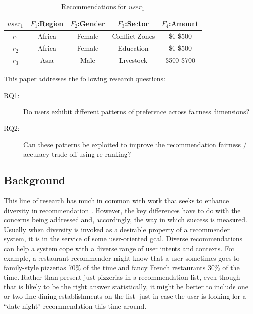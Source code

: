 \begin{table}[tbh]\centering
    \begin{tabular}{|c|c|c|c|c|}
    \hline
        $user_{1}$ & $F_{1}$:Region & $F_{2}$:Gender & $F_{3}$:Sector & $F_{4}$:Amount \\
    \hline
        $r_{1}$ & Africa & Female & Conflict Zones & \$0-\$500\\
    \hline
        $r_{2}$ & Africa & Female & Education & \$0-\$500\\
    \hline \rowcolor[gray]{0.7}
        $r_{3}$ & Asia & Male & Livestock & \$500-\$700\\
    \hline
    \end{tabular}
    \caption{Recommendations for $user_{1}$}
    \label{table_user_recoms}
\end{table}


This paper addresses the following research questions:
\begin{description}
    \item [RQ1:] Do users exhibit different patterns of preference across fairness dimensions?
    \item [RQ2:] Can these patterns be exploited to improve the recommendation fairness / accuracy trade-off using re-ranking?
\end{description}

\subsection{Background}
\label{subsec:ofair_backgroundd}

This line of research has much in common with work that seeks to enhance diversity in recommendation \cite{zhang2008MonotonyDiv, vargas2011rankRelDiv, carbonell1998use, eskandanian2017clustering}. However, the key differences have to do with the concerns being addressed and, accordingly, the way in which success is measured. Usually when diversity is invoked as a desirable property of a recommender system, it is in the service of some user-oriented goal. Diverse recommendations can help a system cope with a diverse range of user intents and contexts. For example, a restaurant recommender might know that a user sometimes goes to family-style pizzerias 70\% of the time and fancy French restaurants 30\% of the time. Rather than present just pizzerias in a recommendation list, even though that is likely to be the right answer statistically, it might be better to include one or two fine dining establishments on the list, just in case the user is looking for a ``date night'' recommendation this time around. 

